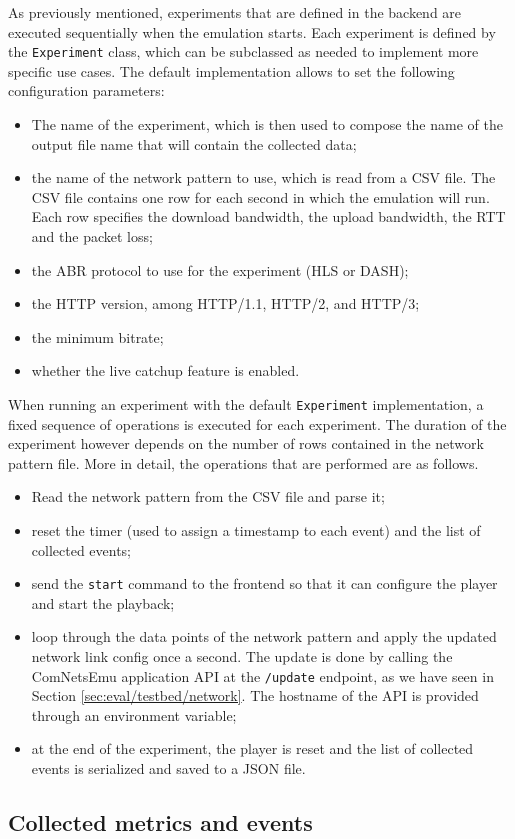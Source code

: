 As previously mentioned, experiments that are defined in the backend are executed sequentially when the emulation starts. Each experiment is defined by the \texttt{Experiment} class, which can be subclassed as needed to implement more specific use cases. The default implementation allows to set the following configuration parameters:

\begin{itemize}
    \item The name of the experiment, which is then used to compose the name of the output file name that will contain the collected data;
    \item the name of the network pattern to use, which is read from a CSV file. The CSV file contains one row for each second in which the emulation will run. Each row specifies the download bandwidth, the upload bandwidth, the RTT and the packet loss;
    \item the ABR protocol to use for the experiment (HLS or DASH);
    \item the HTTP version, among HTTP/1.1, HTTP/2, and HTTP/3;
    \item the minimum bitrate;
    \item whether the live catchup feature is enabled.
\end{itemize}


When running an experiment with the default \texttt{Experiment} implementation, a fixed sequence of operations is executed for each experiment. The duration of the experiment however depends on the number of rows contained in the network pattern file. More in detail, the operations that are performed are as follows.

\begin{itemize}
    \item Read the network pattern from the CSV file and parse it;
    \item reset the timer (used to assign a timestamp to each event) and the list of collected events;
    \item send the \texttt{start} command to the frontend so that it can configure the player and start the playback;
    \item loop through the data points of the network pattern and apply the updated network link config once a second. The update is done by calling the ComNetsEmu application API at the \texttt{/update} endpoint, as we have seen in Section \ref{sec:eval/testbed/network}. The hostname of the API is provided through an environment variable;
    \item at the end of the experiment, the player is reset and the list of collected events is serialized and saved to a JSON file.
\end{itemize}

\subsection{Collected metrics and events}
\label{sec:eval/testbed/metrics}










